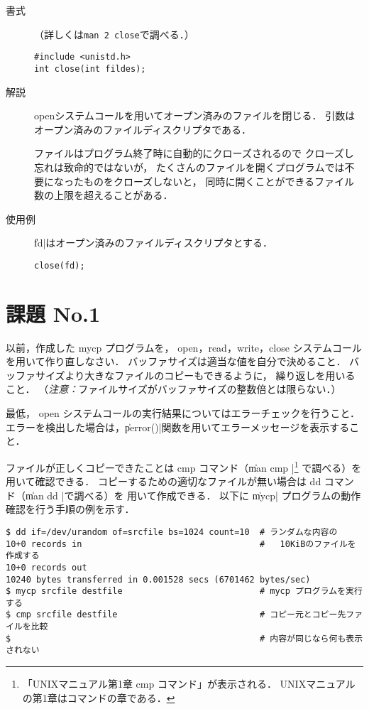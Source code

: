 \begin{description}
\item[書式]（詳しくは\texttt{man 2 close}で調べる．）

\begin{lstlisting}[numbers=none]
#include <unistd.h>
int close(int fildes);
\end{lstlisting}

\item[解説]
openシステムコールを用いてオープン済みのファイルを閉じる．
引数はオープン済みのファイルディスクリプタである．

ファイルはプログラム終了時に自動的にクローズされるので
クローズし忘れは致命的ではないが，
たくさんのファイルを開くプログラムでは不要になったものをクローズしないと，
同時に開くことができるファイル数の上限を超えることがある．

\item[使用例]
\|fd|はオープン済みのファイルディスクリプタとする．

\begin{lstlisting}[numbers=none]
close(fd);
\end{lstlisting}
\end{description}

\section*{課題 No.1}
以前，作成した mycp プログラムを，
open，read，write，close システムコールを用いて作り直しなさい．
バッファサイズは適当な値を自分で決めること．
バッファサイズより大きなファイルのコピーもできるように，
繰り返しを用いること．
（\emph{注意：}ファイルサイズがバッファサイズの整数倍とは限らない．）

最低，
open システムコールの実行結果についてはエラーチェックを行うこと．
エラーを検出した場合は，\|perror()|関数を用いてエラーメッセージを表示すること．

ファイルが正しくコピーできたことは cmp コマンド（\| man cmp |\footnote{
「UNIXマニュアル第1章 cmp コマンド」が表示される．
UNIXマニュアルの第1章はコマンドの章である．} で調べる）を
用いて確認できる．
コピーするための適切なファイルが無い場合は dd コマンド（\| man dd |で調べる）を
用いて作成できる．
以下に \|mycp| プログラムの動作確認を行う手順の例を示す．

\begin{lstlisting}[numbers=none]
$ dd if=/dev/urandom of=srcfile bs=1024 count=10  # ランダムな内容の
10+0 records in                                   #   10KiBのファイルを作成する
10+0 records out
10240 bytes transferred in 0.001528 secs (6701462 bytes/sec)
$ mycp srcfile destfile                           # mycp プログラムを実行する
$ cmp srcfile destfile                            # コピー元とコピー先ファイルを比較
$                                                 # 内容が同じなら何も表示されない
\end{lstlisting}

